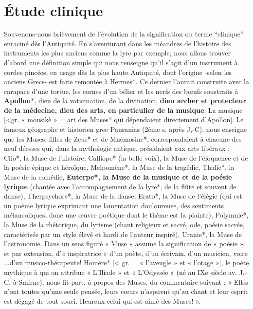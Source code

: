 \chapter[\'Etude clinique]{\'Etude clinique}

Souvenons-nous brièvement de l'évolution de la signification du terme
``clinique'' enraciné dès l'Antiquité.
En s’aventurant dans les méandres de l’histoire des instruments les plus anciens comme la lyre par exemple, nous allons trouver d’abord une définition simple qui nous renseigne qu’il s’agit d’un instrument à cordes pincées, en usage dès la plus haute Antiquité, dont l’origine -selon les anciens Grecs- est faite remontée à Hermes*.
Ce dernier l’aurait construite avec la carapace d’une tortue, les cornes d’un bélier et les nerfs des bœufs soustraits à \textbf{Apollon}*, dieu de la vaticination, de la divination, \textbf{dieu archer et protecteur de la médecine, dieu des arts, en particulier de la musique}.
La musique [<gr. « mousikè » = art des Muses* qui dépendaient directement d’Apollon].
Le fameux géographe et historien grec Pausanias (2ème s. après J,-C), nous enseigne que les Muses, filles de Zeus* et de Mnémosine*, correspondaient à chacune des neuf déesses qui, dans la mythologie antique, présidaient aux arts libéraux : Clio*, la Muse de l’histoire, Calliope* (la belle voix), la Muse de l’éloquence et de la poésie épique et héroïque, Melpomène*, la Muse de la tragédie, Thalie*, la Muse de la comédie, \textbf{Euterpe*, la Muse de la musique et de la poésie lyrique} (chantée avec l’accompagnement de la lyre*, de la flûte et souvent de danse), Therpsychore*, la Muse de la danse, Erato*, la Muse de l’élégie (qui est un poème lyrique exprimant une lamentation douloureuse, des sentiments mélancoliques, donc une œuvre poétique dont le thème est la plainte), Polymnie*, la Muse de la rhétorique, du lyrisme (chant religieux et sacré, ode, poésie sacrée, caractérisée par un style élevé et hardi de l’auteur inspiré), Uranie*, la Muse de l’astronomie.
Dans un sens figuré « Muse » assume la signification de « poésie », et par extension, d’« inspiratrice » d’un poète, d’un écrivain, d’un musicien, voire ...d’un musico-thérapeute!
Homère* [< gr. = « l’aveugle » et « l’otage »], le poète mythique à qui on attribue « L’Iliade » et « L’Odyssée » (né au IXe siècle av. J.-C. à Smirne), nous fît part, à propos des Muses, du commentaire suivant : « Elles n’ont toutes qu’une seule pensée, leurs cœurs n’aspirent qu’au chant et leur esprit est dégagé de tout souci. Heureux celui qui est aimé des Muses! ».



